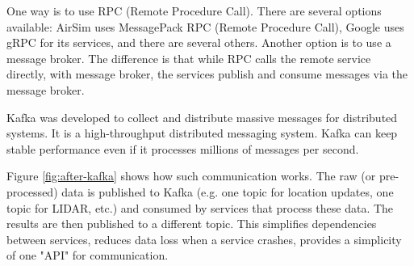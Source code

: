 \documentclass{article}
\let\cite\citep
\begin{document}
One way is to use RPC (Remote Procedure Call). There are several options available: AirSim uses MessagePack RPC (Remote Procedure Call), Google uses gRPC for its services, and there are several others. Another option is to use a message broker. The difference is that while RPC calls the remote service directly, with message broker, the services publish and consume messages via the message broker.

Kafka was developed to collect and distribute massive messages for distributed systems. It is a high-throughput distributed messaging system. Kafka can keep stable performance even if it processes millions of messages per second. \cite{wang2015kafka}

Figure \ref{fig:after-kafka} shows how such communication works. The raw (or pre-processed) data is published to Kafka (e.g. one topic for location updates, one topic for LIDAR, etc.) and consumed by services that process these data. The results are then published to a different topic. This simplifies dependencies between services, reduces data loss when a service crashes, provides a simplicity of one "API" for communication.






\end{document}
